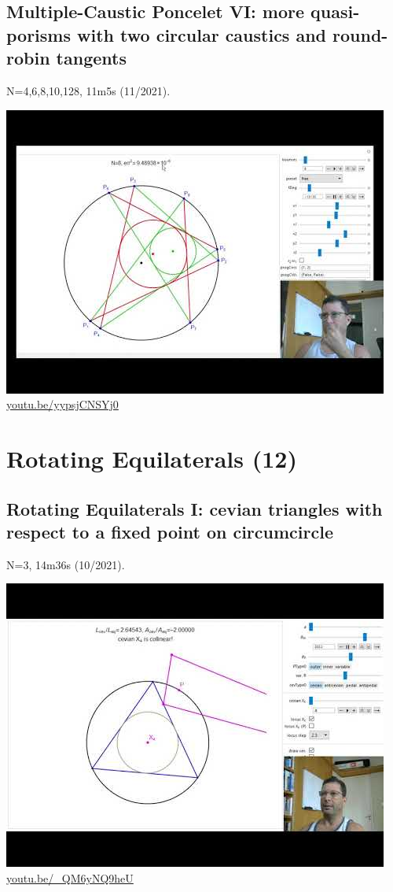 \documentclass[12pt]{amsart}
\begin{document}
\subsection{Multiple-Caustic Poncelet VI: more quasi-porisms with two circular caustics and round-robin tangents}
\label{vid:yypsjCNSYj0}
\noindent N=4,6,8,10,128, 11m5s (11/2021). 
\begin{center}\includegraphics[width=.5\textwidth]{pics/yypsjCNSYj0.jpg} \\ 
\href{https://youtu.be/yypsjCNSYj0}{\url{youtu.be/yypsjCNSYj0}}\end{center}
% 


\section{Rotating Equilaterals (12)}

\subsection{Rotating Equilaterals I: cevian triangles with respect to a fixed point on circumcircle}
\label{vid:_QM6yNQ9heU}
\noindent N=3, 14m36s (10/2021). 
\begin{center}\includegraphics[width=.5\textwidth]{pics/_QM6yNQ9heU.jpg} \\ 
\href{https://youtu.be/_QM6yNQ9heU}{\url{youtu.be/\_QM6yNQ9heU}}\end{center}
% 
\end{document}
